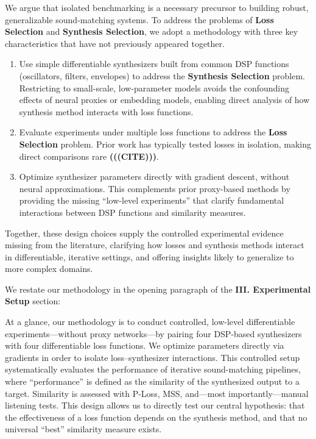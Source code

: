 \documentclass[11pt]{article}
\newcommand{\LossSelect}{\textbf{Loss Selection}}
\newcommand{\SynthSelect}{\textbf{Synthesis Selection}}
\begin{document}
\begin{displayquote}
    We argue that isolated benchmarking is a necessary precursor to building robust, generalizable sound-matching systems. To address the problems of \LossSelect{} and \SynthSelect{}, we adopt a methodology with three key characteristics that have not previously appeared together.

\begin{enumerate}
    \item Use simple differentiable synthesizers built from common DSP functions (oscillators, filters, envelopes) to address the \SynthSelect{} problem. Restricting to small-scale, low-parameter models avoids the confounding effects of neural proxies or embedding models, enabling direct analysis of how synthesis method interacts with loss functions. 
    \item Evaluate experiments under multiple loss functions to address the \LossSelect{} problem. Prior work has typically tested losses in isolation, making direct comparisons rare \textbf{(((CITE)))}.  
    \item Optimize synthesizer parameters directly with gradient descent, without neural approximations. This complements prior proxy-based methods by providing the missing “low-level experiments” that clarify fundamental interactions between DSP functions and similarity measures. 
\end{enumerate}

Together, these design choices supply the controlled experimental evidence missing from the literature, 
clarifying how losses and synthesis methods interact in differentiable, iterative settings, 
and offering insights likely to generalize to more complex domains.

\end{displayquote}


\medskip
\noindent We restate our methodology in the opening paragraph of the \textbf{III. Experimental Setup} section:

\begin{displayquote}
    At a glance, our methodology is to conduct controlled, low-level differentiable experiments—without proxy networks—by pairing four DSP-based synthesizers with four differentiable loss functions. We optimize parameters directly via gradients in order to isolate loss–synthesizer interactions. This controlled setup systematically evaluates the performance of iterative sound-matching pipelines, where “performance” is defined as the similarity of the synthesized output to a target. Similarity is assessed with P-Loss, MSS, and—most importantly—manual listening tests. This design allows us to directly test our central hypothesis: that the effectiveness of a loss function depends on the synthesis method, and that no universal “best” similarity measure exists.
\end{displayquote}
\end{document}

